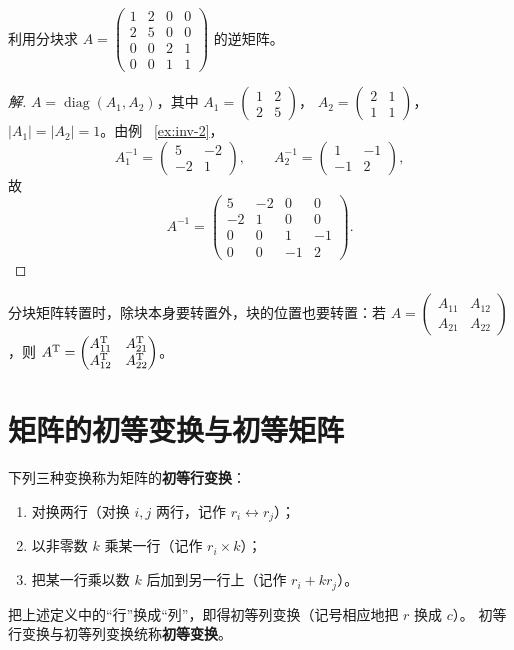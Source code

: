 \begin{example}
利用分块求
$A=\begin{pmatrix} 1 & 2 & 0 & 0 \\ 2 & 5 & 0 & 0 \\ 0 & 0 & 2 & 1 \\ 0 & 0 & 1 & 1 \end{pmatrix}$
的逆矩阵。
\end{example}
\begin{proof}[解]
$A=\operatorname{diag}(A_1,A_2)$，其中
$A_1=\begin{pmatrix} 1 & 2 \\ 2 & 5 \end{pmatrix}$，
$A_2=\begin{pmatrix} 2 & 1 \\ 1 & 1 \end{pmatrix}$，$|A_1|=|A_2|=1$。由例
~\ref{ex:inv-2}，
\[
  A_1^{-1}=\begin{pmatrix} 5 & -2 \\ -2 & 1 \end{pmatrix},
  \qquad
  A_2^{-1}=\begin{pmatrix} 1 & -1 \\ -1 & 2 \end{pmatrix},
\]
故
\[
  A^{-1}=\begin{pmatrix}
    5 & -2 & 0 & 0 \\ -2 & 1 & 0 & 0 \\ 0 & 0 & 1 & -1 \\ 0 & 0 & -1 & 2
  \end{pmatrix}.
\]
\end{proof}

分块矩阵转置时，除块本身要转置外，块的位置也要转置：若
$A=\begin{pmatrix} A_{11} & A_{12} \\ A_{21} & A_{22} \end{pmatrix}$，则
$A^{\mathrm{T}}=\begin{pmatrix} A_{11}^{\mathrm{T}} & A_{21}^{\mathrm{T}} \\ A_{12}^{\mathrm{T}} & A_{22}^{\mathrm{T}} \end{pmatrix}$。

\section{矩阵的初等变换与初等矩阵}\label{sec:elementary}

\begin{definition}\label{def:elementary-op}
下列三种变换称为矩阵的\textbf{初等行变换}：
\begin{enumerate}[label=(\arabic*), itemsep=0pt]
  \item 对换两行（对换 $i,j$ 两行，记作 $r_i\leftrightarrow r_j$）；
  \item 以非零数 $k$ 乘某一行（记作 $r_i\times k$）；
  \item 把某一行乘以数 $k$ 后加到另一行上（记作 $r_i+kr_j$）。
\end{enumerate}
把上述定义中的“行”换成“列”，即得初等列变换（记号相应地把 $r$ 换成 $c$）。
初等行变换与初等列变换统称\textbf{初等变换}。
\end{definition}

